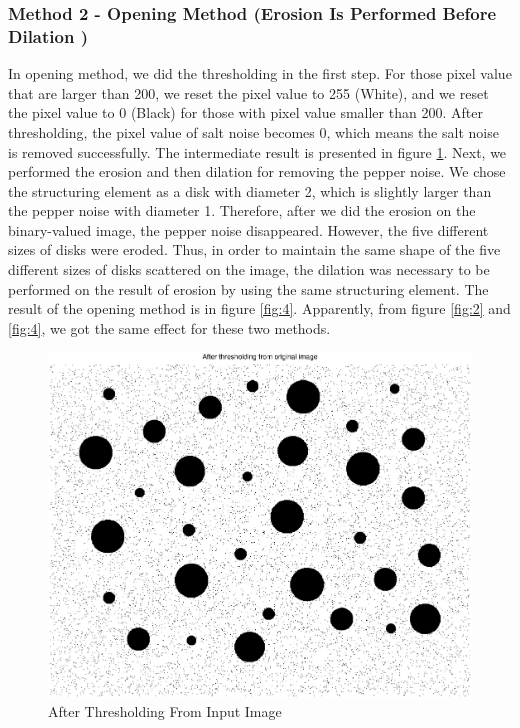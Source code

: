 \documentclass[paper=a4, fontsize=11pt]{scrartcl}
\begin{document}
\subsubsection{Method 2 -  Opening Method (Erosion Is Performed Before Dilation )}

In opening method,  we did the thresholding in the first step. For those pixel value that are larger than 200, we reset the pixel value to 255 (White), and we reset the pixel value to 0 (Black) for those with pixel value smaller than 200.  After thresholding, the pixel value of  salt noise becomes 0, which means the salt noise is removed successfully. The intermediate result is presented in figure \ref{fig:3}. Next, we performed the erosion and then dilation for removing the pepper noise. We chose the structuring element as a disk with diameter 2, which is slightly larger than the pepper noise with diameter 1. Therefore, after we did the erosion on the binary-valued image, the pepper noise disappeared. However, the five different sizes of disks were eroded. Thus, in order to maintain the same shape of the five different sizes of disks scattered on the image, the dilation was necessary to be performed on the result of erosion by using the same structuring element. The result of the opening method is in figure \ref{fig:4}. Apparently, from figure \ref{fig:2} and \ref{fig:4}, we got the same effect for these two methods.
\begin{figure}
	\centering
	\includegraphics[width=12cm]{threshold.eps}
	\caption{After Thresholding From Input Image}
	\label{fig:3}
\end{figure}
\end{document}
